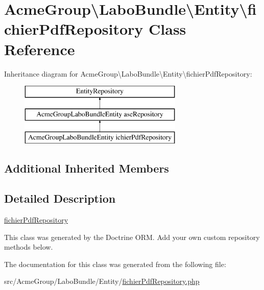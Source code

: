 \hypertarget{class_acme_group_1_1_labo_bundle_1_1_entity_1_1fichier_pdf_repository}{\section{Acme\+Group\textbackslash{}Labo\+Bundle\textbackslash{}Entity\textbackslash{}fichier\+Pdf\+Repository Class Reference}
\label{class_acme_group_1_1_labo_bundle_1_1_entity_1_1fichier_pdf_repository}
}
Inheritance diagram for Acme\+Group\textbackslash{}Labo\+Bundle\textbackslash{}Entity\textbackslash{}fichier\+Pdf\+Repository\+:\begin{figure}[H]
\begin{center}
\leavevmode
\includegraphics[height=3.000000cm]{class_acme_group_1_1_labo_bundle_1_1_entity_1_1fichier_pdf_repository}
\end{center}
\end{figure}
\subsection*{Additional Inherited Members}


\subsection{Detailed Description}
\hyperlink{class_acme_group_1_1_labo_bundle_1_1_entity_1_1fichier_pdf_repository}{fichier\+Pdf\+Repository}

This class was generated by the Doctrine O\+R\+M. Add your own custom repository methods below. 

The documentation for this class was generated from the following file\+:\begin{DoxyCompactItemize}
\item 
src/\+Acme\+Group/\+Labo\+Bundle/\+Entity/\hyperlink{fichier_pdf_repository_8php}{fichier\+Pdf\+Repository.\+php}\end{DoxyCompactItemize}
